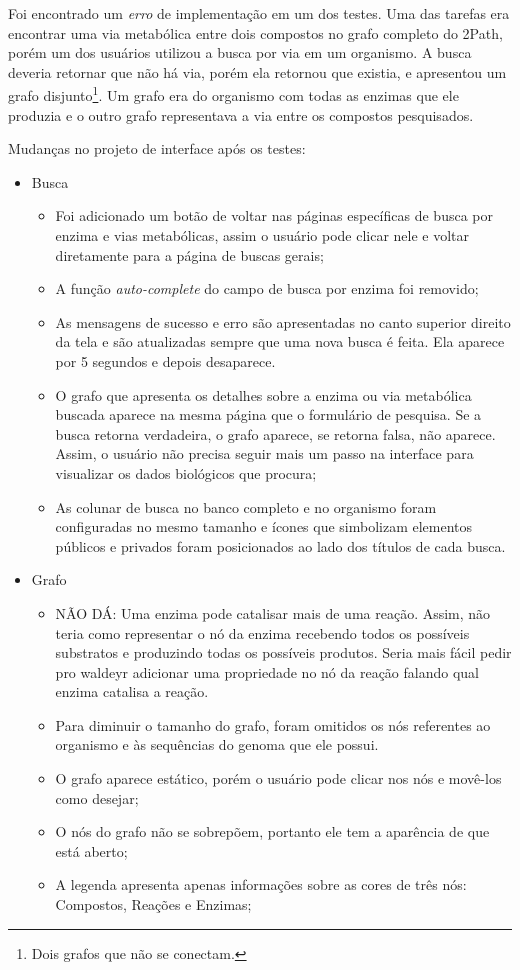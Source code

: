 Foi encontrado um \textit{erro} de implementação em um dos testes. Uma das tarefas era encontrar uma via metabólica entre dois compostos no grafo completo do 2Path, porém um dos usuários utilizou a busca por via em um organismo. A busca deveria retornar que não há via, porém ela retornou que existia, e apresentou um grafo disjunto\footnote{Dois grafos que não se conectam.}. Um grafo era do organismo com todas as enzimas que ele produzia e o outro grafo representava a via entre os compostos pesquisados.


Mudanças no projeto de interface após os testes:
\begin{itemize}
\item Busca
  \begin{itemize}
  \item[1] Foi adicionado um botão de voltar nas páginas específicas de busca por enzima e vias metabólicas, assim o usuário pode clicar nele e voltar diretamente para a página de buscas gerais;
  \item[2] A função \textit{auto-complete} do campo de busca por enzima foi removido;
  \item[3] As mensagens de sucesso e erro são apresentadas no canto superior direito da tela e são atualizadas sempre que uma nova busca é feita. Ela aparece por 5 segundos e depois desaparece.
  \item[4, 5] O grafo que apresenta os detalhes sobre a enzima ou via metabólica buscada aparece na mesma página que o formulário de pesquisa. Se a busca retorna verdadeira, o grafo aparece, se retorna falsa, não aparece. Assim, o usuário não precisa seguir mais um passo na interface para visualizar os dados biológicos que procura;
  \item[6] As colunar de busca no banco completo e no organismo foram configuradas no mesmo tamanho e ícones que simbolizam elementos públicos e privados foram posicionados ao lado dos títulos de cada busca.
  \end{itemize}
  
\item Grafo
  \begin{itemize} 
  \item[1] NÃO DÁ: Uma enzima pode catalisar mais de uma reação. Assim, não teria como representar o nó da enzima recebendo todos os possíveis substratos e produzindo todas os possíveis produtos. Seria mais fácil pedir pro waldeyr adicionar uma propriedade no nó da reação falando qual enzima catalisa a reação.
  \item[2, 3, 4] Para diminuir o tamanho do grafo, foram omitidos os nós referentes ao organismo e às sequências do genoma que ele possui.
  \item[5] O grafo aparece estático, porém o usuário pode clicar nos nós e movê-los como desejar;
  \item[6] O nós do grafo não se sobrepõem, portanto ele tem a aparência de que está aberto;
  \item[7] A legenda apresenta apenas informações sobre as cores de três nós: Compostos, Reações e Enzimas;
  \end{itemize}
\end{itemize}
 

